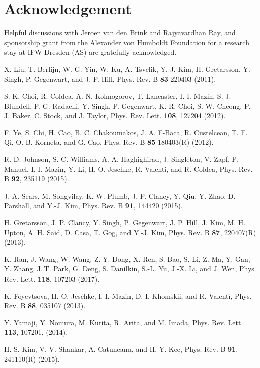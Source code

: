 \documentclass[aps,prb,fleqn,12pt,amsmath,amssymb]{revtex4}
\begin{document}
\section*{Acknowledgement}
Helpful discussions with Jeroen van den Brink and Rajyavardhan Ray, and sponsorship grant from the Alexander von Humboldt Foundation for a research stay at IFW Dresden (AS) are gratefully acknowledged. 

\begin{thebibliography}{99}

 X. Liu, T. Berlijn, W.-G. Yin, W. Ku, A. Tsvelik, Y.-J. Kim, H. Gretarsson, Y. Singh, P. Gegenwart, and J. P. Hill, Phys. Rev. B {\bf 83} 220403 (2011).

 S. K. Choi, R. Coldea, A. N. Kolmogorov, T. Lancaster, I. I. Mazin, S. J. Blundell, P. G. Radaelli, Y. Singh, P. Gegenwart, K. R. Choi, S.-W. Cheong, P. J. Baker, C. Stock, and J. Taylor, Phys. Rev. Lett. {\bf 108}, 127204 (2012). 

F. Ye, S. Chi, H. Cao, B. C. Chakoumakos, J. A. F-Baca, R. Custelcean, T. F. Qi, O. B. Korneta, and G. Cao, Phys. Rev. B {\bf 85} 180403(R) (2012).

 R. D. Johnson, S. C. Williams, A. A. Haghighirad, J. Singleton, V. Zapf, P. Manuel, I. I. Mazin, Y. Li, H. O. Jeschke, R. Valentí, and R. Coldea, Phys. Rev. B {\bf 92}, 235119 (2015).

 J. A. Sears, M. Songvilay, K. W. Plumb, J. P. Clancy, Y. Qiu, Y. Zhao, D. Parshall, and Y.-J. Kim, Phys. Rev. B {\bf 91}, 144420 (2015).

 H. Gretarsson, J. P. Clancy, Y. Singh, P. Gegenwart, J. P. Hill, J. Kim, M. H. Upton, A. H. Said, D. Casa, T. Gog, and Y.-J. Kim, Phys. Rev. B {\bf 87}, 220407(R) (2013).

 K. Ran, J. Wang, W. Wang, Z.-Y. Dong, X. Ren, S. Bao, S. Li, Z. Ma, Y. Gan, Y. Zhang, J. T. Park, G. Deng, S. Danilkin, S.-L. Yu, J.-X. Li, and J. Wen, Phys. Rev. Lett. {\bf 118}, 107203 (2017).

 K. Foyevtsova, H. O. Jeschke, I. I. Mazin, D. I. Khomskii, and R. Valent\'{\i}, Phys. Rev. B {\bf 88}, 035107 (2013).

 Y. Yamaji, Y. Nomura, M. Kurita, R. Arita, and M. Imada, Phys. Rev. Lett. {\bf 113}, 107201, (2014).

 H.-S. Kim, V. V. Shankar, A. Catuneanu, and H.-Y. Kee,  Phys. Rev. B {\bf 91},  241110(R) (2015).


\end{thebibliography}
\end{document}

